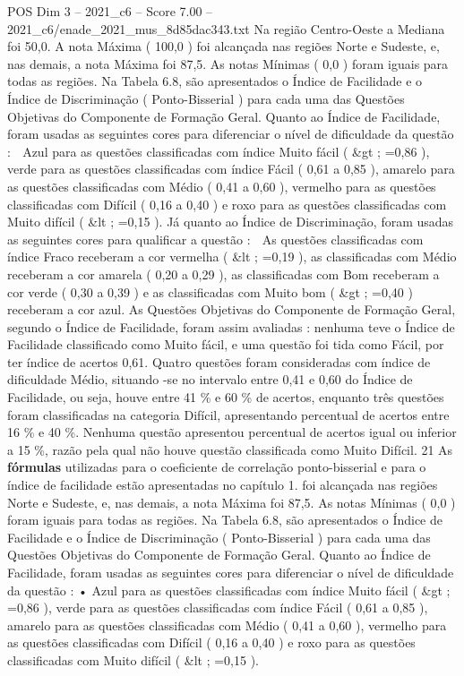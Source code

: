 \begin{textsample}{POS Dim 3 – 2021\_c6 – Score 7.00 – 2021\_c6/enade\_2021\_mus\_8d85dac343.txt}
Na região Centro-Oeste a Mediana foi 50,0.
A nota Máxima ( 100,0 ) foi alcançada nas regiões Norte e Sudeste, e, nas demais, a nota Máxima foi 87,5.
As notas Mínimas ( 0,0 ) foram iguais para todas as regiões.
Na Tabela 6.8, são apresentados o Índice de Facilidade e o Índice de Discriminação ( Ponto-Bisserial ) para cada uma das Questões Objetivas do Componente de Formação Geral.
Quanto ao Índice de Facilidade, foram usadas as seguintes cores para diferenciar o nível de dificuldade da questão :  Azul para as questões classificadas com índice Muito fácil ( \&gt ; =0,86 ), verde para as questões classificadas com índice Fácil ( 0,61 a 0,85 ), amarelo para as questões classificadas com Médio ( 0,41 a 0,60 ), vermelho para as questões classificadas com Difícil ( 0,16 a 0,40 ) e roxo para as questões classificadas com Muito difícil ( \&lt ; =0,15 ).
Já quanto ao Índice de Discriminação, foram usadas as seguintes cores para qualificar a questão :  As questões classificadas com índice Fraco receberam a cor vermelha ( \&lt ; =0,19 ), as classificadas com Médio receberam a cor amarela ( 0,20 a 0,29 ), as classificadas com Bom receberam a cor verde ( 0,30 a 0,39 ) e as classificadas com Muito bom ( \&gt ; =0,40 ) receberam a cor azul.
As Questões Objetivas do Componente de Formação Geral, segundo o Índice de Facilidade, foram assim avaliadas : nenhuma teve o Índice de Facilidade classificado como Muito fácil, e uma questão foi tida como Fácil, por ter índice de acertos 0,61.
Quatro questões foram consideradas com índice de dificuldade Médio, situando -se no intervalo entre 0,41 e 0,60 do Índice de Facilidade, ou seja, houve entre 41 \% e 60 \% de acertos, enquanto três questões foram classificadas na categoria Difícil, apresentando percentual de acertos entre 16 \% e 40 \%.
Nenhuma questão apresentou percentual de acertos igual ou inferior a 15 \%, razão pela qual não houve questão classificada como Muito Difícil. 21 As \textbf{fórmulas} utilizadas para o coeficiente de correlação ponto-bisserial e para o índice de facilidade estão apresentadas no capítulo 1. foi alcançada nas regiões Norte e Sudeste, e, nas demais, a nota Máxima foi 87,5.
As notas Mínimas ( 0,0 ) foram iguais para todas as regiões.
Na Tabela 6.8, são apresentados o Índice de Facilidade e o Índice de Discriminação ( Ponto-Bisserial ) para cada uma das Questões Objetivas do Componente de Formação Geral.
Quanto ao Índice de Facilidade, foram usadas as seguintes cores para diferenciar o nível de dificuldade da questão : • Azul para as questões classificadas com índice Muito fácil ( \&gt ; =0,86 ), verde para as questões classificadas com índice Fácil ( 0,61 a 0,85 ), amarelo para as questões classificadas com Médio ( 0,41 a 0,60 ), vermelho para as questões classificadas com Difícil ( 0,16 a 0,40 ) e roxo para as questões classificadas com Muito difícil ( \&lt ; =0,15 ).

\end{textsample}
